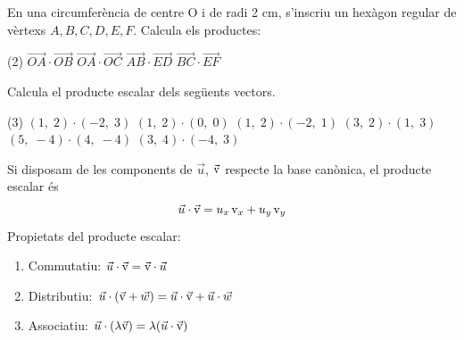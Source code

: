\begin{mylist}
	\exer En una circumferència de centre O i de radi 2 cm, s'inscriu un hexàgon regular de vèrtexs $A, B, C, D, E, F$. Calcula els productes:
		\begin{tasks}(2)
		\task $\overrightarrow{OA}\cdot \overrightarrow{OB}$
		\task $\overrightarrow{OA}\cdot \overrightarrow{OC}$ 
		\task  $\overrightarrow{AB}\cdot \overrightarrow{ED}$
		\task $\overrightarrow{BC}\cdot \overrightarrow{EF}$
	\end{tasks}

\begin{noexerbreak}
		
	\exer \mental Calcula el producte escalar dels següents vectors.
	\begin{tasks}(3)
		\task $\left(1,\; 2\right)\cdot \left(-2,\; 3\right)$  
		\task  $\left(1,\; 2\right)\cdot \left(0,\; 0\right)$  
		\task $\left(1,\; 2\right)\cdot \left(-2,\; 1\right)$  
		\task  $\left(3,\; 2\right)\cdot \left(1,\; 3\right)$
		\task  $\left(5,\; -4\right)\cdot \left(4,\; -4\right)$
		\task  $\left(3,\; 4\right) \cdot \left(-4,\; 3\right)$
	\end{tasks}
\answers{[4, 0, 0, 9, 36, 0]}
	
\end{noexerbreak}

\end{mylist}

\vspace{0.5cm}

\begin{theorybox}
	Si disposam de les components  de $\vec u$, $\vec{\mathrm{v}}$ respecte la base canònica, el producte escalar és
	\begin{equation}
	\label{eq:dotproduct2}
	\vec u \cdot \vec{\mathrm{v}}= u_x \, \mathrm{v}_x + u_y\, \mathrm{v}_y
	\end{equation}
	Propietats del producte escalar:
	\begin{enumerate}
		\item Commutatiu: $\vec u \cdot \vec{\mathrm{v}} = \vec{\mathrm{v}}\cdot \vec u$
		\item Distributiu: $\vec u \cdot (\vec{\mathrm{v}}+ \vec w) = \vec u \cdot \vec{\mathrm{v}}+ \vec u \cdot \vec w$	
		\item Associatiu: $\vec u \cdot (\lambda \vec{\mathrm{v}}) = \lambda (\vec u \cdot \vec{\mathrm{v}})$
	\end{enumerate}
\end{theorybox}

